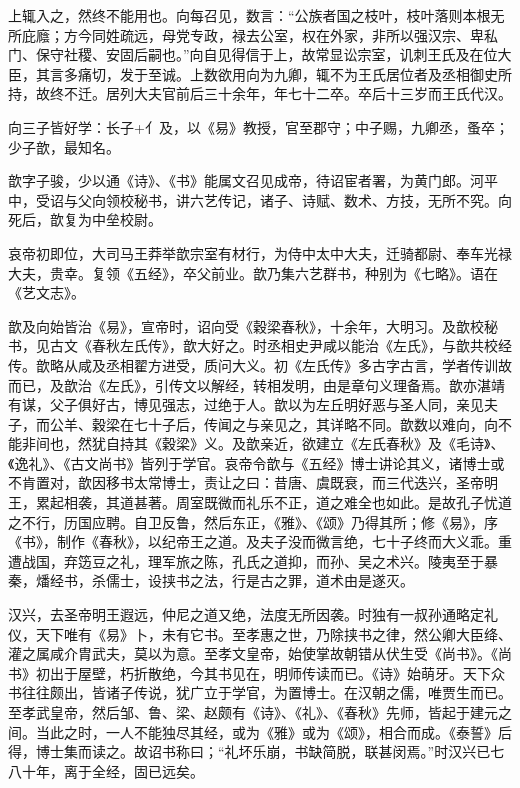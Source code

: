 \documentclass[12pt,UTF8]{ctexbook}
\begin{document}
上辄入之，然终不能用也。向每召见，数言：“公族者国之枝叶，枝叶落则本根无所庇廕；方今同姓疏远，母党专政，禄去公室，权在外家，非所以强汉宗、卑私门、保守社稷、安固后嗣也。”向自见得信于上，故常显讼宗室，讥刺王氏及在位大臣，其言多痛切，发于至诚。上数欲用向为九卿，辄不为王氏居位者及丞相御史所持，故终不迁。居列大夫官前后三十余年，年七十二卒。卒后十三岁而王氏代汉。



向三子皆好学：长子+亻及，以《易》教授，官至郡守；中子赐，九卿丞，蚤卒；少子歆，最知名。



歆字子骏，少以通《诗》、《书》能属文召见成帝，待诏宦者署，为黄门郎。河平中，受诏与父向领校秘书，讲六艺传记，诸子、诗赋、数术、方技，无所不究。向死后，歆复为中垒校尉。



哀帝初即位，大司马王莽举歆宗室有材行，为侍中太中大夫，迁骑都尉、奉车光禄大夫，贵幸。复领《五经》，卒父前业。歆乃集六艺群书，种别为《七略》。语在《艺文志》。



歆及向始皆治《易》，宣帝时，诏向受《穀梁春秋》，十余年，大明习。及歆校秘书，见古文《春秋左氏传》，歆大好之。时丞相史尹咸以能治《左氏》，与歆共校经传。歆略从咸及丞相翟方进受，质问大义。初《左氏传》多古字古言，学者传训故而已，及歆治《左氏》，引传文以解经，转相发明，由是章句义理备焉。歆亦湛靖有谋，父子俱好古，博见强志，过绝于人。歆以为左丘明好恶与圣人同，亲见夫子，而公羊、穀梁在七十子后，传闻之与亲见之，其详略不同。歆数以难向，向不能非间也，然犹自持其《穀梁》义。及歆亲近，欲建立《左氏春秋》及《毛诗》、《逸礼》、《古文尚书》皆列于学官。哀帝令歆与《五经》博士讲论其义，诸博士或不肯置对，歆因移书太常博士，责让之曰：昔唐、虞既衰，而三代迭兴，圣帝明王，累起相袭，其道甚著。周室既微而礼乐不正，道之难全也如此。是故孔子忧道之不行，历国应聘。自卫反鲁，然后东正，《雅》、《颂》乃得其所；修《易》，序《书》，制作《春秋》，以纪帝王之道。及夫子没而微言绝，七十子终而大义乖。重遭战国，弃笾豆之礼，理军旅之陈，孔氏之道抑，而孙、吴之术兴。陵夷至于暴秦，燔经书，杀儒士，设挟书之法，行是古之罪，道术由是遂灭。



汉兴，去圣帝明王遐远，仲尼之道又绝，法度无所因袭。时独有一叔孙通略定礼仪，天下唯有《易》卜，未有它书。至孝惠之世，乃除挟书之律，然公卿大臣绛、灌之属咸介胄武夫，莫以为意。至孝文皇帝，始使掌故朝错从伏生受《尚书》。《尚书》初出于屋壁，朽折散绝，今其书见在，明师传读而已。《诗》始萌牙。天下众书往往颇出，皆诸子传说，犹广立于学官，为置博士。在汉朝之儒，唯贾生而已。至孝武皇帝，然后邹、鲁、梁、赵颇有《诗》、《礼》、《春秋》先师，皆起于建元之间。当此之时，一人不能独尽其经，或为《雅》或为《颂》，相合而成。《泰誓》后得，博士集而读之。故诏书称曰；“礼坏乐崩，书缺简脱，联甚闵焉。”时汉兴已七八十年，离于全经，固已远矣。
\end{document}
